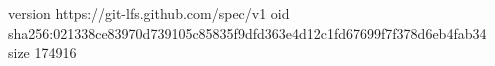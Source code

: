 version https://git-lfs.github.com/spec/v1
oid sha256:021338ce83970d739105c85835f9dfd363e4d12c1fd67699f7f378d6eb4fab34
size 174916
